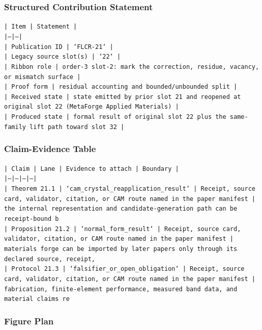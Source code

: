 \documentclass[11pt]{article}
\begin{document}
\subsubsection*{Structured Contribution Statement}

\noindent\texttt{| Item | Statement |}\\
\noindent\texttt{|---|---|}\\
\noindent\texttt{| Publication ID | `FLCR-21` |}\\
\noindent\texttt{| Legacy source slot(s) | `22` |}\\
\noindent\texttt{| Ribbon role | order-3 slot-2: mark the correction, residue, vacancy, or mismatch surface |}\\
\noindent\texttt{| Proof form | residual accounting and bounded/unbounded split |}\\
\noindent\texttt{| Received state | state emitted by prior slot 21 and reopened at original slot 22 (MetaForge Applied Materials) |}\\
\noindent\texttt{| Produced state | formal result of original slot 22 plus the same-family lift path toward slot 32 |}\\

\subsubsection*{Claim-Evidence Table}

\noindent\texttt{| Claim | Lane | Evidence to attach | Boundary |}\\
\noindent\texttt{|---|---|---|---|}\\
\noindent\texttt{| Theorem 21.1 | `cam\_crystal\_reapplication\_result` | Receipt, source card, validator, citation, or CAM route named in the paper manifest | the internal representation and candidate-generation path can be receipt-bound b}\\
\noindent\texttt{| Proposition 21.2 | `normal\_form\_result` | Receipt, source card, validator, citation, or CAM route named in the paper manifest | materials forge can be imported by later papers only through its declared source, receipt,}\\
\noindent\texttt{| Protocol 21.3 | `falsifier\_or\_open\_obligation` | Receipt, source card, validator, citation, or CAM route named in the paper manifest | fabrication, finite-element performance, measured band data, and material claims re}\\

\subsubsection*{Figure Plan}
\end{document}
